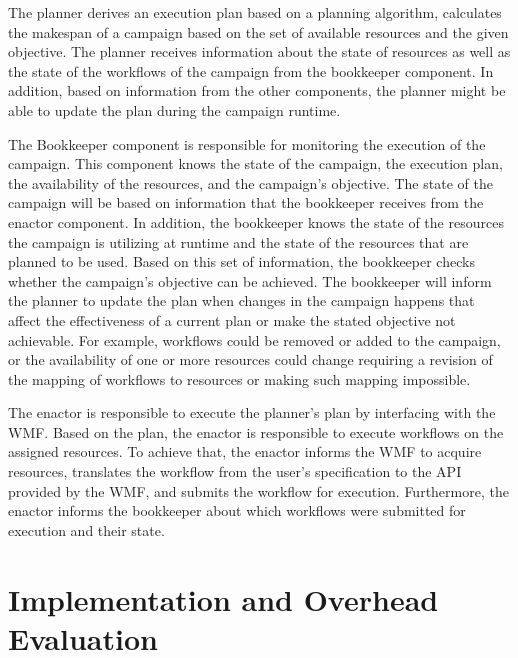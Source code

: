 The planner derives an execution plan based on a planning algorithm, calculates the makespan of a campaign based on the set of available resources and the given objective. 
The planner receives information about the state of resources as well as the state of the workflows of the campaign from the bookkeeper component.
In addition, based on information from the other components, the planner might be able to update the plan during the campaign runtime. 

The Bookkeeper component is responsible for monitoring the execution of the campaign.
This component knows the state of the campaign, the execution plan, the availability of the resources, and the campaign's objective.
The state of the campaign will be based on information that the bookkeeper receives from the enactor component.
In addition, the bookkeeper knows the state of the resources the campaign is utilizing at runtime and the state of the resources that are planned to be used.
Based on this set of information, the bookkeeper checks whether the campaign's objective can be achieved.
The bookkeeper will inform the planner to update the plan when changes in the campaign happens that affect the effectiveness of a current plan or make the stated objective not achievable. 
For example, workflows could be removed or added to the campaign, or the availability of one or more resources could change requiring a revision of the mapping of workflows to resources or making such mapping impossible.

The enactor is responsible to execute the planner's plan by interfacing with the WMF.
Based on the plan, the enactor is responsible to execute workflows on the assigned resources.
To achieve that, the enactor informs the WMF to acquire resources, translates the workflow from the user's specification to the API provided by the WMF, and submits the workflow for execution.
Furthermore, the enactor informs the bookkeeper about which workflows were submitted for execution and their state.

\section{Implementation and Overhead Evaluation}
\label{sec:cm_impl}
